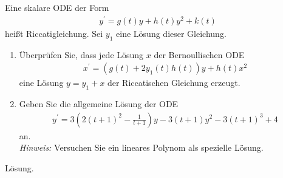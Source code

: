 \begin{exercise}
Eine skalare ODE der Form
\begin{align*}
  y^{\prime} = g(t)y + h(t)y^2 + k(t)
\end{align*}
heißt Riccatigleichung. Sei $y_1$ eine Lösung dieser Gleichung.
\begin{enumerate}[label = \textbf{\alph*)}]
  \item Überprüfen Sie, dass jede Lösung $x$ der Bernoullischen ODE
  \begin{align*}
    x^{\prime} = (g(t) + 2y_1(t)h(t))y + h(t)x^2
  \end{align*}
  eine Lösung $y = y_1 + x$ der Riccatischen Gleichung erzeugt.
  \item Geben Sie die allgemeine Lösung der ODE
  \begin{align*}
    y^{\prime} = 3\left(2(t+1)^2 - \frac{1}{t+1}\right)y - 3(t+1)y^2 - 3(t+1)^3 + 4
  \end{align*}
  an. \\
  \textit{Hinweis:} Versuchen Sie ein lineares Polynom als spezielle Lösung.
\end{enumerate}
\end{exercise}
\begin{solution}
Lösung.
\end{solution}
